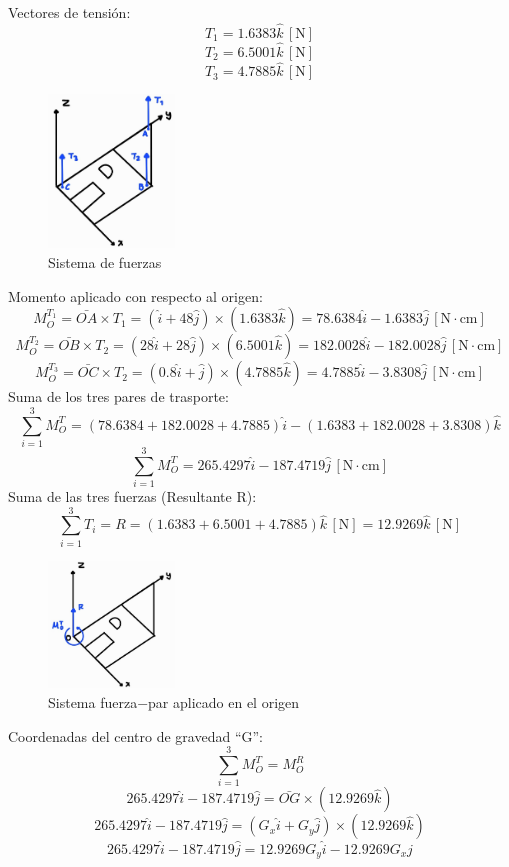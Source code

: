 \documentclass[12pt, titlepage]{report}
\newcommand{\unit}[1]{\ensuremath{\, \mathrm{#1}}}
\begin{document}
    \newpage
    Vectores de tensión:
    $$T_1 = 1.6383 \hat{k} \unit{[N]}$$
    $$T_2 = 6.5001 \hat{k} \unit{[N]}$$
    $$T_3 = 4.7885 \hat{k} \unit{[N]}$$

    \begin{figure}[ht]
        \centering
        \includegraphics[width=0.3\textwidth]{Sistema_Fuerzas.jpg}
        \caption{Sistema de fuerzas}
    \end{figure}
    Momento aplicado con respecto al origen:
    $$M^{T_1}_O = \bar{OA} \times T_1 = (\hat{i} + 48\hat{j}) \times (1.6383\hat{k}) = 78.6384\hat{i} - 1.6383\hat{j} \unit{[N\cdot cm]}$$
    $$M^{T_2}_O = \bar{OB} \times T_2 = (28\hat{i} + 28\hat{j}) \times (6.5001\hat{k}) = 182.0028\hat{i} - 182.0028\hat{j} \unit{[N\cdot cm]}$$
    $$M^{T_3}_O = \bar{OC} \times T_2 = (0.8\hat{i} + \hat{j}) \times (4.7885\hat{k}) = 4.7885\hat{i} - 3.8308\hat{j} \unit{[N\cdot cm]}$$
    Suma de los tres pares de trasporte:
    $$\sum_{i = 1}^{3} M^T_O = (78.6384 + 182.0028 + 4.7885)\hat{i} - (1.6383 + 182.0028 + 3.8308)\hat{k} $$
    $$\sum_{i = 1}^{3} M^T_O = 265.4297\hat{i} - 187.4719\hat{j} \unit{[N\cdot cm]}$$
    Suma de las tres fuerzas (Resultante R):
    $$\sum_{i = 1}^{3} T_i = R =(1.6383 + 6.5001 + 4.7885)\hat{k} \unit{[N]} = 12.9269\hat{k} \unit{[N]}$$

    \begin{figure}[ht]
        \centering
        \includegraphics[width=0.3\textwidth]{Sistema_Fuerza-Par.jpg}
        \caption{ Sistema fuerza$-$par aplicado en el origen}
    \end{figure}
    \newpage
    Coordenadas del centro de gravedad ``G'':
    $$\sum_{i=1}^{3} M^T_{O} = M^R_{O}$$
    $$265.4297\hat{i} - 187.4719\hat{j} = \bar{OG} \times (12.9269\hat{k})$$
    $$265.4297\hat{i} - 187.4719\hat{j} = (G_x\hat{i} + G_y\hat{j}) \times (12.9269\hat{k})$$
    $$265.4297\hat{i} - 187.4719\hat{j} =  12.9269G_y\hat{i} - 12.9269G_x\hat{j}$$
\end{document}
